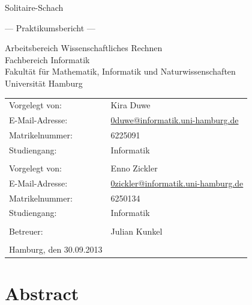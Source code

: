 \documentclass[
	12pt,
	a4paper,
	BCOR10mm,
	DIV14,
	listof=totoc,
	bibliography=totoc,
	headsepline
]{scrreprt}
\begin{document}
\begin{titlepage}
	\begin{center}
		{\titlefont\huge Solitaire-Schach\par}

		\bigskip
		\bigskip

		{\titlefont\Large --- Praktikumsbericht ---\par}

		\bigskip
		\bigskip

		{\large Arbeitsbereich Wissenschaftliches Rechnen\\
		Fachbereich Informatik\\
		Fakultät für Mathematik, Informatik und Naturwissenschaften\\
		Universität Hamburg\par}
	\end{center}

	\vfill

	{\large \begin{tabular}{ll}
		Vorgelegt von: & Kira Duwe\\
		E-Mail-Adresse: & \href{mailto:adresse@email.de}{0duwe@informatik.uni-hamburg.de} \\
		Matrikelnummer: & 6225091 \\
		Studiengang: & Informatik \\
		\\
			Vorgelegt von: & Enno Zickler\\
		E-Mail-Adresse: & \href{mailto:adresse@email.de}{0zickler@informatik.uni-hamburg.de} \\
		Matrikelnummer: & 6250134 \\
		Studiengang: & Informatik \\
		\\
		Betreuer: & Julian Kunkel \\
		\\
		Hamburg, den 30.09.2013
	\end{tabular}\par}
\end{titlepage}

\chapter*{Abstract}

\thispagestyle{empty}
\end{document}
